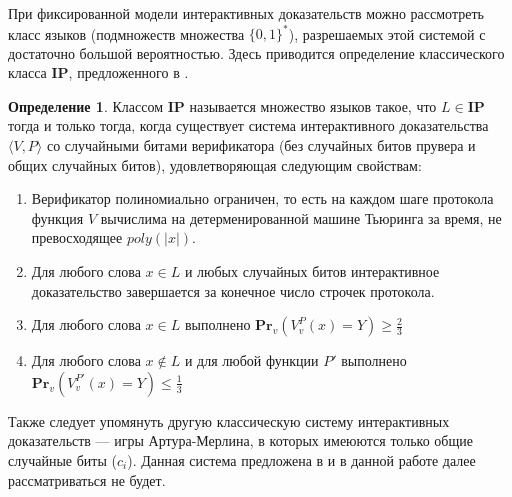 \documentclass{mipt-thesis-bs}
\theoremstyle{plain}
\theoremstyle{definition}
\newtheorem{definition}{Определение}
\newcommand{\word}{\{0, 1\}^*}
\newcommand{\poly}{\textit{poly}}
\newcommand{\pr}[2]{\textbf{Pr}_{#1}\left(#2\right)}
\begin{document}
При фиксированной модели интерактивных доказательств можно рассмотреть класс языков (подмножеств множества $\word$), разрешаемых этой системой с достаточно большой вероятностью. Здесь приводится определение классического класса $\textbf{IP}$, предложенного в \cite{goldwasser1989ip}.
\begin{definition}\label{ip}
Классом $\textbf{IP}$ называется множество языков такое, что $L \in \textbf{IP}$ тогда и только тогда, когда существует система интерактивного доказательства $\langle V, P\rangle$ со случайными битами верификатора (без случайных битов прувера и общих случайных битов), удовлетворяющая следующим свойствам:
\begin{enumerate}
    \item Верификатор полиномиально ограничен, то есть на каждом шаге протокола функция $V$ вычислима на детерменированной машине Тьюринга за время, не превосходящее $\poly(|x|)$.
    \item Для любого слова $x \in L$ и любых случайных битов интерактивное доказательство завершается за конечное число строчек протокола.
    \item Для любого слова $x \in L$ выполнено $\pr{v}{V^P_{v}(x) = Y} \geq \frac{2}{3}$
    \item Для любого слова $x \notin L$ и для любой функции $P'$ выполнено\\$\pr{v}{V^{P'}_{v}(x) = Y} \leq \frac{1}{3}$
\end{enumerate}
\end{definition}
Также следует упомянуть другую классическую систему интерактивных доказательств --- игры Артура-Мерлина, в которых имеюются только общие случайные биты ($c_{i}$). Данная система предложена в \cite{babai1988arthur} и в данной работе далее рассматриваться не будет.
\end{document}
